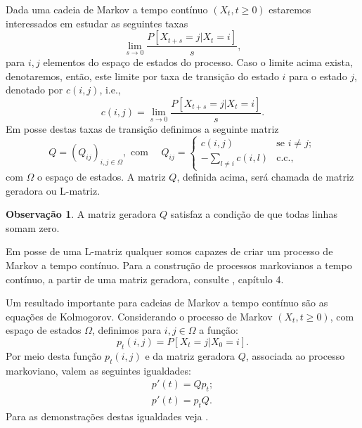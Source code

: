 \documentclass[twoside,openright,titlepage,numbers=noenddot,headinclude,  lineheaders footinclude=true,cleardoublepage=empty,
                                BCOR=5mm,paper=a4,fontsize=12pt ]{scrbook}
\theoremstyle{definition}
\newtheorem*{obs*}{Observação}
\begin{document}
Dada uma cadeia de Markov a tempo contínuo $(X_t, t \geq 0)$ estaremos interessados
em estudar as seguintes taxas
\[
\lim_{s \rightarrow 0} \frac{ P[ X_{t+s} = j| X_t = i] }{s},
\]
para $i, j$ elementos do espaço de estados do processo. Caso o limite acima exista, 
denotaremos, então, este limite por taxa de transição do estado $i$ para o
estado $j$, denotado por $c(i, j)$, i.e.,
\[
c(i, j) = \lim_{s \rightarrow 0} \frac{ P[ X_{t+s} = j| X_t = i] }{s}.
\]
Em posse destas taxas de transição definimos a seguinte matriz 
\[
Q = (Q_{ij})_{i,j \in \Omega}, \text{ com } \quad
Q_{ij} = 
\begin{cases}
c(i, j) & \text{se } i \neq j;\\
-\sum_{l \neq i} c(i, l) & \text{c.c.},
\end{cases}
\]
com $\Omega$ o espaço de estados.
A matriz $Q$, definida acima,  será chamada de matriz geradora ou L-matriz. 
\begin{obs*}
A matriz geradora $Q$ satisfaz a condição de que todas linhas somam zero.
\end{obs*}

Em posse de uma L-matriz qualquer somos capazes de criar um processo de
Markov a tempo contínuo. Para a construção de processos markovianos a tempo
contínuo, a partir de uma matriz geradora, consulte
\cite{durret1}, capítulo 4.

Um resultado importante para cadeias de Markov a tempo contínuo são as equações
de Kolmogorov. Considerando o processo de Markov $(X_t, t \geq 0)$, com espaço
de estados $\Omega$, definimos para $i, j \in \Omega$ a função:
\[
p_t(i, j)  = P[X_t = j| X_0 = i].
\]
Por meio desta função $p_t(i,j)$ e da matriz geradora $Q$, associada ao processo markoviano,
valem as seguintes igualdades:
\begin{align*} 
p'(t) = Q p_t; \tag{Equação Regressiva de Kolmogorov} \\
p'(t) =  p_t Q. \tag{Equação Progressiva de Kolmogorov}
\end{align*}
Para as demonstrações destas igualdades veja \cite{durret1}.


\end{document}
